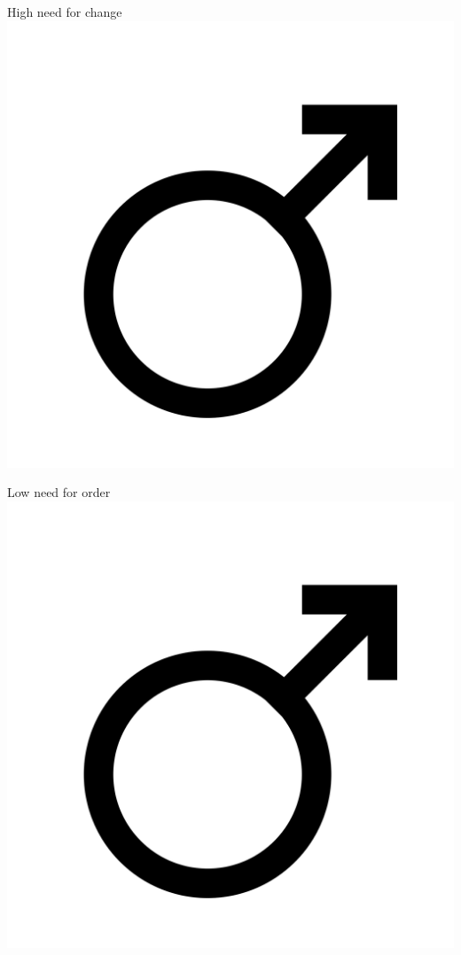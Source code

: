 \documentclass[aspectratio=169]{beamer}
\begin{document}
\begin{frame}
  \begin{center}
    \Huge High need for change \\
    \includegraphics[scale=.025]{./assets/men.png} \\
    \small \cite{langford93}
  \end{center}
\end{frame}

\begin{frame}
  \begin{center}
    \Huge Low need for order \\
    \includegraphics[scale=.025]{./assets/men.png} \\
    \small \cite{langford93}
  \end{center}
\end{frame}
\end{document}
